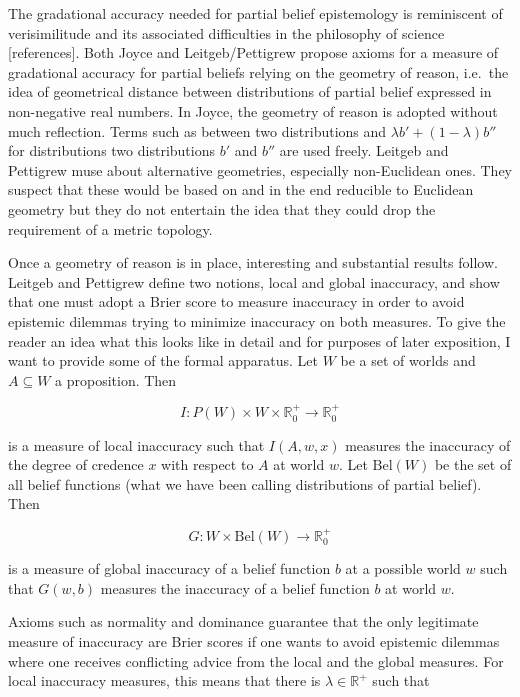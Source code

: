 \documentclass[11pt]{article}
\begin{document}
The gradational accuracy needed for partial belief epistemology is
reminiscent of verisimilitude and its associated difficulties in the
philosophy of science [references]. Both Joyce and Leitgeb/Pettigrew
propose axioms for a measure of gradational accuracy for partial
beliefs relying on the geometry of reason, i.e.\ the idea of
geometrical distance between distributions of partial belief expressed
in non-negative real numbers. In Joyce, the geometry of reason is
adopted without much reflection. Terms such as 
between two distributions and $\lambda{}b'+(1-\lambda)b''$ for
distributions  two distributions $b'$ and $b''$ are
used freely. Leitgeb and Pettigrew muse about alternative geometries,
especially non-Euclidean ones. They suspect that these would be based
on and in the end reducible to Euclidean geometry but they do not
entertain the idea that they could drop the requirement of a metric
topology.

Once a geometry of reason is in place, interesting and substantial
results follow. Leitgeb and Pettigrew define two notions, local and
global inaccuracy, and show that one must adopt a Brier score to
measure inaccuracy in order to avoid epistemic dilemmas trying to
minimize inaccuracy on both measures. To give the reader an idea what
this looks like in detail and for purposes of later exposition, I want
to provide some of the formal apparatus. Let $W$ be a set of worlds
and $A\subseteq{}W$ a proposition. Then

\begin{equation}
  \label{eq:linacc}
  I:P(W)\times{}W\times{}\mathbb{R}^{+}_{0}\rightarrow\mathbb{R}^{+}_{0}
\end{equation}

{\noindent}is a measure of local inaccuracy such that $I(A,w,x)$
measures the inaccuracy of the degree of credence $x$ with respect to
$A$ at world $w$. Let $\mbox{Bel}(W)$ be the set of all belief
functions (what we have been calling distributions of partial belief).
Then

\begin{equation}
  \label{eq:ginacc}
  G:W\times\mbox{Bel}(W)\rightarrow\mathbb{R}^{+}_{0}
\end{equation}

{\noindent}is a measure of global inaccuracy of a belief function $b$
at a possible world $w$ such that $G(w,b)$ measures the inaccuracy of
a belief function $b$ at world $w$.

Axioms such as normality and dominance guarantee that the only
legitimate measure of inaccuracy are Brier scores if one wants to
avoid epistemic dilemmas where one receives conflicting advice from
the local and the global measures. For local inaccuracy measures, this
means that there is $\lambda\in\mathbb{R}^{+}$ such that
\end{document}
